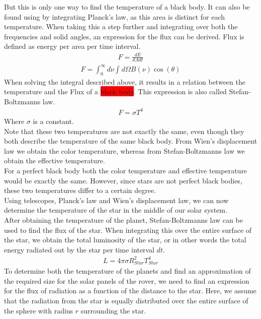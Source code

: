 \documentclass[reprint,english,notitlepage]{revtex4-2}
\begin{document}
But this is only one way to find the temperature of a black body.
It can also be found using by integrating Planck's law, as this area is distinct for each temperature.
When taking this a step further and integrating over both the frequencies and solid angles, an expression for the flux can be derived.
Flux is defined as energy per area per time interval.
\begin{align*}
    F = \frac{dE}{dA dt}
\end{align*}
\begin{align*}
    F = \int_{0}^{\infty} d\nu \int_{}^{} d\Omega B(\nu) \cos\left(\theta\right)
\end{align*}
When solving the integral described above, it results in a relation between the temperature and the Flux of a \colorbox{red}{black body}.
This expression is also called Stefan-Boltzmanns law.
\begin{align}
    F = \sigma T^4 \label{stefan_boltzmann_law}
\end{align}
Where $\sigma$ is a constant.\\
Note that these two temperatures are not exactly the same, even though they both describe the temperature of the same black body.
From Wien's displacement law we obtain the color temperature, whereas from Stefan-Boltzmanns law we obtain the effective temperature.\\
For a perfect black body both the color temperature and effective temperature would be exactly the same.
However, since stars are not perfect black bodies, these two temperatures differ to a certain degree.\\
Using telescopes, Planck's law and Wien's displacement law, we can now determine the temperature of the star in the middle of our solar system.\\
After obtaining the temperature of the planet, Stefan-Boltzmanns law can be used to find the flux of the star.
When integrating this over the entire surface of the star, we obtain the total luminosity of the star, or in other words the total energy radiated out by the star per time interval $dt$.
\begin{align}
    L = 4 \pi \sigma R_{Star}^2 T_{Star}^4 \label{Luminosity}
\end{align}
To determine both the temperature of the planets and find an approximation of the required size for the solar panels of the rover, we need to find an expression for the flux of radiation as a function of the distance to the star.
Here, we assume that the radiation from the star is equally distributed over the entire surface of the sphere with radius $r$ surrounding the star.\\
\end{document}
